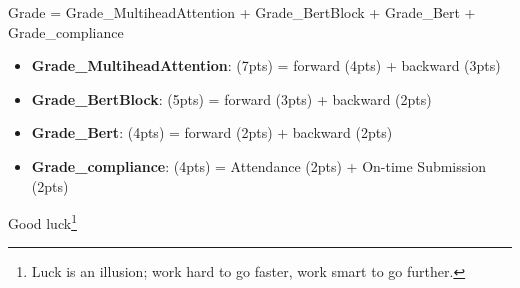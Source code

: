 \documentclass{../../../extra/aakpract/aakpract}
\begin{document}
Grade = Grade\_MultiheadAttention + Grade\_BertBlock + Grade\_Bert + Grade\_compliance
	\begin{itemize}
		\item \textbf{Grade\_MultiheadAttention}: (7pts) = forward (4pts) + backward (3pts)
		\item \textbf{Grade\_BertBlock}: (5pts) = forward (3pts) + backward (2pts)
		\item \textbf{Grade\_Bert}: (4pts) = forward (2pts) + backward (2pts)
		\item \textbf{Grade\_compliance}: (4pts) = Attendance (2pts) + On-time Submission (2pts)
	\end{itemize}

\begin{flushright}
	Good luck\footnote{Luck is an illusion; work hard to go faster, work smart to go further.}
\end{flushright}
\end{document}
